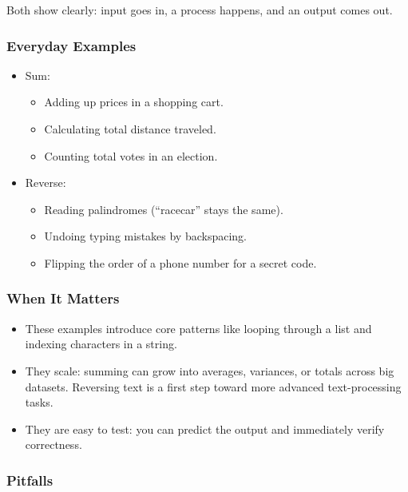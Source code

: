 \documentclass[
  letterpaper,
  DIV=11,
  numbers=noendperiod]{scrreprt}
\providecommand{\tightlist}{%
  \setlength{\itemsep}{0pt}\setlength{\parskip}{0pt}}
\begin{document}
Both show clearly: input goes in, a process happens, and an output comes
out.

\subsubsection{Everyday Examples}\label{everyday-examples-18}

\begin{itemize}
\item
  Sum:

  \begin{itemize}
  \tightlist
  \item
    Adding up prices in a shopping cart.
  \item
    Calculating total distance traveled.
  \item
    Counting total votes in an election.
  \end{itemize}
\item
  Reverse:

  \begin{itemize}
  \tightlist
  \item
    Reading palindromes (``racecar'' stays the same).
  \item
    Undoing typing mistakes by backspacing.
  \item
    Flipping the order of a phone number for a secret code.
  \end{itemize}
\end{itemize}

\subsubsection{When It Matters}\label{when-it-matters-17}

\begin{itemize}
\tightlist
\item
  These examples introduce core patterns like looping through a list and
  indexing characters in a string.
\item
  They scale: summing can grow into averages, variances, or totals
  across big datasets. Reversing text is a first step toward more
  advanced text-processing tasks.
\item
  They are easy to test: you can predict the output and immediately
  verify correctness.
\end{itemize}

\subsubsection{Pitfalls}\label{pitfalls-16}
\end{document}
